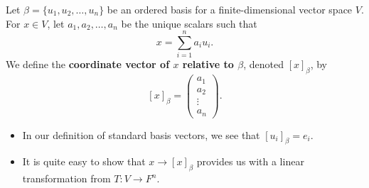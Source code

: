 \begin{definition}
    Let \( \beta = \{ u_{1}, u_{2}, \dots, u_{n} \}  \) be an ordered basis for a finite-dimensional vector space \( V  \). For \( x \in V  \), let \( a_{1}, a_{2}, \dots, a_{n} \) be the unique scalars such that 
    \[  x = \sum_{ i=1 }^{ n } a_{i} u_{i}. \]
    We define the \textbf{coordinate vector of \( x \) relative to \( \beta \)}, denoted \( [x]_{\beta} \), by
    \[ [x]_{\beta} = \begin{pmatrix}
        a_{1} \\
        a_{2} \\
        \vdots \\
        a_{n}
    \end{pmatrix}. \]
\end{definition}
\begin{itemize}
    \item In our definition of standard basis vectors, we see that \( [u_{i}]_{\beta} = e_{i}  \).
    \item It is quite easy to show that \( x \to [x]_{\beta} \) provides us with a linear transformation from \( T: V \to F^{n} \).
\end{itemize}




